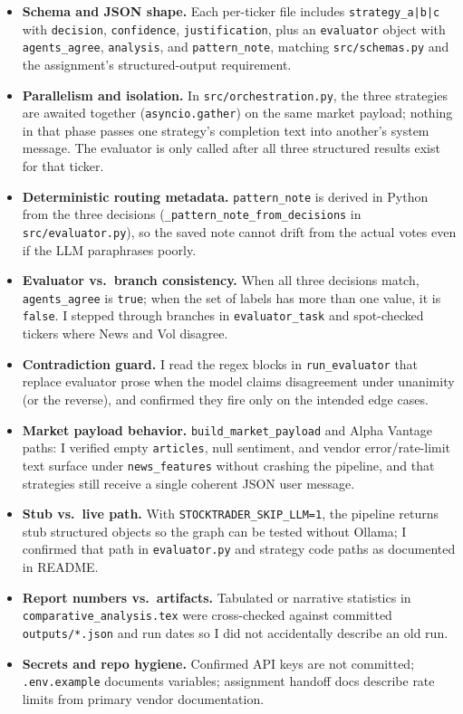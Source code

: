 \documentclass[11pt]{article}
\begin{document}
\begin{itemize}
  \item \textbf{Schema and JSON shape.} Each per-ticker file includes \texttt{strategy\_a|b|c} with \texttt{decision}, \texttt{confidence}, \texttt{justification}, plus an \texttt{evaluator} object with \texttt{agents\_agree}, \texttt{analysis}, and \texttt{pattern\_note}, matching \texttt{src/schemas.py} and the assignment's structured-output requirement.
  \item \textbf{Parallelism and isolation.} In \texttt{src/orchestration.py}, the three strategies are awaited together (\texttt{asyncio.gather}) on the same market payload; nothing in that phase passes one strategy's completion text into another's system message. The evaluator is only called after all three structured results exist for that ticker.
  \item \textbf{Deterministic routing metadata.} \texttt{pattern\_note} is derived in Python from the three decisions (\texttt{\_pattern\_note\_from\_decisions} in \texttt{src/evaluator.py}), so the saved note cannot drift from the actual votes even if the LLM paraphrases poorly.
  \item \textbf{Evaluator vs.\ branch consistency.} When all three decisions match, \texttt{agents\_agree} is \texttt{true}; when the set of labels has more than one value, it is \texttt{false}. I stepped through branches in \texttt{evaluator\_task} and spot-checked tickers where News and Vol disagree.
  \item \textbf{Contradiction guard.} I read the regex blocks in \texttt{run\_evaluator} that replace evaluator prose when the model claims disagreement under unanimity (or the reverse), and confirmed they fire only on the intended edge cases.
  \item \textbf{Market payload behavior.} \texttt{build\_market\_payload} and Alpha Vantage paths: I verified empty \texttt{articles}, null sentiment, and vendor error/rate-limit text surface under \texttt{news\_features} without crashing the pipeline, and that strategies still receive a single coherent JSON user message.
  \item \textbf{Stub vs.\ live path.} With \texttt{STOCKTRADER\_SKIP\_LLM=1}, the pipeline returns stub structured objects so the graph can be tested without Ollama; I confirmed that path in \texttt{evaluator.py} and strategy code paths as documented in README.
  \item \textbf{Report numbers vs.\ artifacts.} Tabulated or narrative statistics in \texttt{comparative\_analysis.tex} were cross-checked against committed \texttt{outputs/*.json} and run dates so I did not accidentally describe an old run.
  \item \textbf{Secrets and repo hygiene.} Confirmed API keys are not committed; \texttt{.env.example} documents variables; assignment handoff docs describe rate limits from primary vendor documentation.
\end{itemize}
\end{document}
